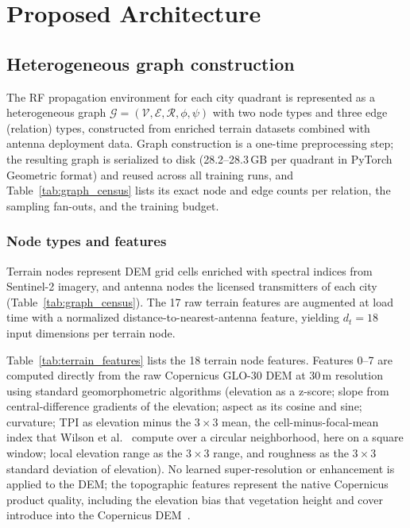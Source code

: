 \documentclass{ieeeaccess}
\begin{document}
\section{Proposed Architecture}
\label{sec:architecture}

\subsection{Heterogeneous graph construction}
\label{sec:graph_construction}

The RF propagation environment for each city quadrant is represented as a heterogeneous graph $\mathcal{G} = (\mathcal{V}, \mathcal{E}, \mathcal{R}, \phi, \psi)$ with two node types and three edge (relation) types, constructed from enriched terrain datasets combined with antenna deployment data. Graph construction is a one-time preprocessing step; the resulting graph is serialized to disk (28.2--28.3\,GB per quadrant in PyTorch Geometric format) and reused across all training runs, and Table~\ref{tab:graph_census} lists its exact node and edge counts per relation, the sampling fan-outs, and the training budget.



\subsubsection{Node types and features}

Terrain nodes represent DEM grid cells enriched with spectral indices from Sentinel-2 imagery, and antenna nodes the licensed transmitters of each city (Table~\ref{tab:graph_census}). The 17 raw terrain features are augmented at load time with a normalized distance-to-nearest-antenna feature, yielding $d_t = 18$ input dimensions per terrain node.

Table~\ref{tab:terrain_features} lists the 18 terrain node features. Features 0--7 are computed directly from the raw Copernicus GLO-30 DEM at 30\,m resolution~\cite{copernicus2022handbook} using standard geomorphometric algorithms (elevation as a z-score; slope from central-difference gradients of the elevation; aspect as its cosine and sine; curvature; TPI as elevation minus the $3\times3$ mean, the cell-minus-focal-mean index that Wilson et al.~\cite{wilson2007multiscale} compute over a circular neighborhood, here on a square window; local elevation range as the $3\times3$ range, and roughness as the $3\times3$ standard deviation of elevation). No learned super-resolution or enhancement is applied to the DEM; the topographic features represent the native Copernicus product quality, including the elevation bias that vegetation height and cover introduce into the Copernicus DEM~\cite{laipelt2024anadem}.
\end{document}
